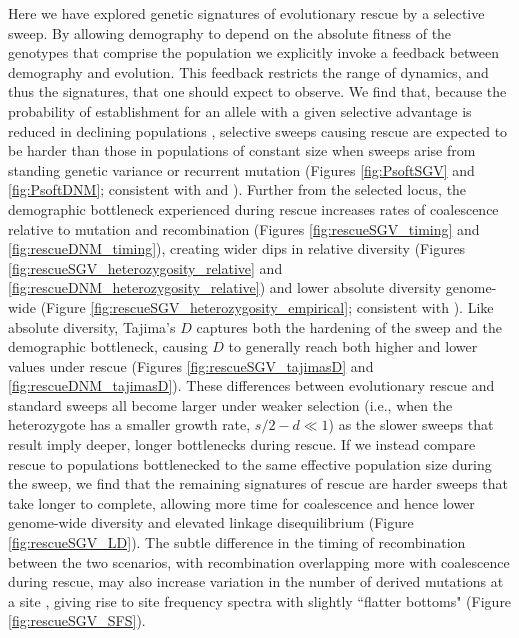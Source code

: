\documentclass[]{article}
\begin{document}
Here we have explored genetic signatures of evolutionary rescue by a selective sweep. 
By allowing demography to depend on the absolute fitness of the genotypes that comprise the population we explicitly invoke a feedback between demography and evolution.
This feedback restricts the range of dynamics, and thus the signatures, that one should expect to observe.
We find that, because the probability of establishment for an allele with a given selective advantage is reduced in declining populations \citep[Equation \ref{eq:pest}; see also][]{otto1997probability}, selective sweeps causing rescue are expected to be harder than those in populations of constant size when sweeps arise from standing genetic variance or recurrent mutation (Figures \ref{fig:PsoftSGV} and \ref{fig:PsoftDNM}; consistent with \citealp{wilson2014soft} and \citealp{wilson2017soft}).
Further from the selected locus, the demographic bottleneck experienced during rescue increases rates of coalescence relative to mutation and recombination (Figures \ref{fig:rescueSGV_timing} and \ref{fig:rescueDNM_timing}), creating wider dips in relative diversity (Figures \ref{fig:rescueSGV_heterozygosity_relative} and \ref{fig:rescueDNM_heterozygosity_relative}) and lower absolute diversity genome-wide (Figure \ref{fig:rescueSGV_heterozygosity_empirical}; consistent with \citealp{innan2004pattern}). 
Like absolute diversity, Tajima's $D$ captures both the hardening of the sweep and the demographic bottleneck, causing $D$ to generally reach both higher and lower values under rescue (Figures \ref{fig:rescueSGV_tajimasD} and \ref{fig:rescueDNM_tajimasD}).
These differences between evolutionary rescue and standard sweeps all become larger under weaker selection (i.e., when the heterozygote has a smaller growth rate, $s/2-d\ll1$) as the slower sweeps that result imply deeper, longer bottlenecks during rescue.
If we instead compare rescue to populations bottlenecked to the same effective population size during the sweep, we find that the remaining signatures of rescue are harder sweeps that take longer to complete, allowing more time for coalescence and hence lower genome-wide diversity and elevated linkage disequilibrium (Figure \ref{fig:rescueSGV_LD}).
The subtle difference in the timing of recombination between the two scenarios, with recombination overlapping more with coalescence during rescue, may also increase variation in the number of derived mutations at a site \citep[as expected following soft sweeps from recurrent mutation in populations of constant size;][]{pennings2006soft}, giving rise to site frequency spectra with slightly ``flatter bottoms" (Figure \ref{fig:rescueSGV_SFS}).
\end{document}
